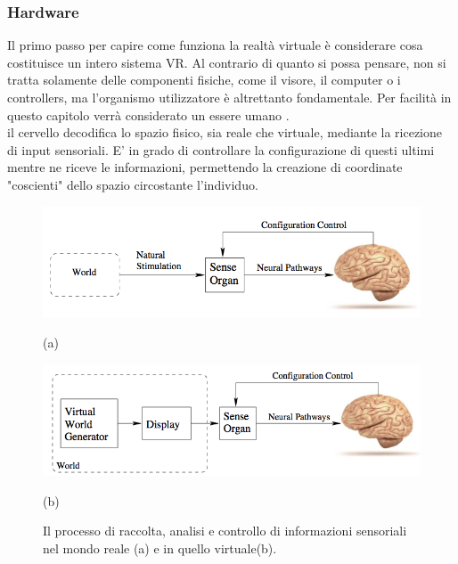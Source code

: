 \subsubsection{Hardware}

Il primo passo per capire come funziona la realtà virtuale è considerare cosa costituisce un intero sistema VR.
Al contrario di quanto si possa pensare, non si tratta solamente delle componenti fisiche, come il visore, il computer o i controllers, ma l'organismo utilizzatore è altrettanto fondamentale. Per facilità in questo capitolo verrà considerato un essere umano .\\
il cervello decodifica lo spazio fisico, sia reale che virtuale, mediante la ricezione di input sensoriali. E' in grado di controllare la configurazione di questi ultimi mentre ne riceve le informazioni, permettendo la creazione di coordinate "coscienti" dello spazio circostante l'individuo.\\
\begin{figure}[H]
	\centering
	\begin{minipage}[b]{0.49\textwidth}
		\includegraphics[width=\textwidth]{figure/RealityBB}
		{\footnotesize \centerline{(a)} \par}
	\end{minipage}
	\hfill
	\begin{minipage}[b]{0.49\textwidth}
		\includegraphics[width=\textwidth]{figure/VRBB}
			{\footnotesize \centerline{(b)} \par}
	\end{minipage}
	\caption{Il processo di raccolta, analisi e controllo di informazioni sensoriali nel mondo reale (a) e in quello virtuale(b).}
\end{figure}

